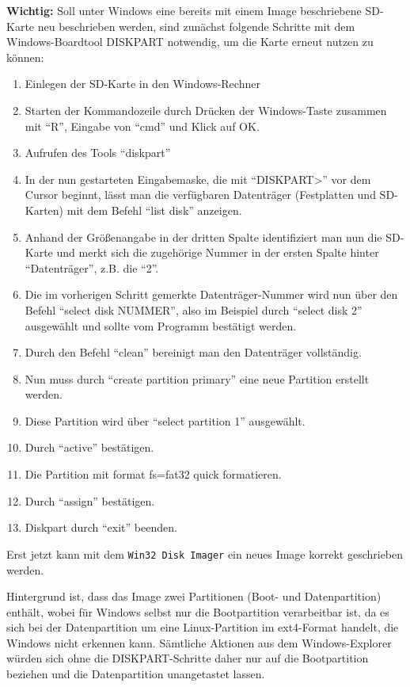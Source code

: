 \documentclass[paper=a4, parskip, numbers=noenddot, toc=listof, headsepline]{scrbook}
\begin{document}
			\textbf{Wichtig:} Soll unter Windows eine bereits mit einem Image beschriebene SD-Karte neu beschrieben werden, sind zunächst folgende Schritte mit dem Windows-Boardtool DISKPART notwendig, um die Karte erneut nutzen zu können:
			\begin{enumerate}
				\item Einlegen der SD-Karte in den Windows-Rechner
				\item Starten der Kommandozeile durch Drücken der Windows-Taste zusammen mit \enquote{R}, Eingabe von \enquote{cmd} und Klick auf {OK}.
				\item Aufrufen des Tools \enquote{diskpart}
				\item In der nun gestarteten Eingabemaske, die mit \enquote{DISKPART>} vor dem Cursor beginnt, lässt man die verfügbaren Datenträger (Festplatten und SD-Karten) mit dem Befehl \enquote{list disk} anzeigen.
				\item Anhand der Größenangabe in der dritten Spalte identifiziert man nun die SD-Karte und merkt sich die zugehörige Nummer in der ersten Spalte hinter \enquote{Datenträger}, z.B. die \enquote{2}.
				\item Die im vorherigen Schritt gemerkte Datenträger-Nummer wird nun über den Befehl \enquote{select disk NUMMER}, also im Beispiel durch \enquote{select disk 2} ausgewählt und sollte vom Programm bestätigt werden.
				\item Durch den Befehl \enquote{clean} bereinigt man den Datenträger vollständig.
				\item Nun muss durch \enquote{create partition primary} eine neue Partition erstellt werden.
				\item Diese Partition wird über \enquote{select partition 1} ausgewählt.
				\item Durch \enquote{active} bestätigen.
				\item Die Partition mit {format fs=fat32 quick} formatieren.
				\item Durch \enquote{assign} bestätigen.
				\item Diskpart durch \enquote{exit} beenden.
			\end{enumerate}
		
			Erst jetzt kann mit dem \texttt{Win32 Disk Imager} ein neues Image korrekt geschrieben werden.
			
			Hintergrund ist, dass das Image zwei Partitionen (Boot- und Datenpartition) enthält, wobei für Windows selbst nur die Bootpartition verarbeitbar ist, da es sich bei der Datenpartition um eine Linux-Partition im ext4-Format handelt, die Windows nicht erkennen kann. Sämtliche Aktionen aus dem Windows-Explorer würden sich ohne die DISKPART-Schritte daher nur auf die Bootpartition beziehen und die Datenpartition unangetastet lassen.
\end{document}
